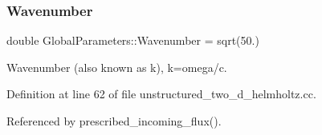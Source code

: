 \subsubsection{\texorpdfstring{Wavenumber}{Wavenumber}}
{\footnotesize\ttfamily double Global\+Parameters\+::\+Wavenumber = sqrt(50.)}



Wavenumber (also known as k), k=omega/c. 



Definition at line 62 of file unstructured\+\_\+two\+\_\+d\+\_\+helmholtz.\+cc.



Referenced by prescribed\+\_\+incoming\+\_\+flux().

